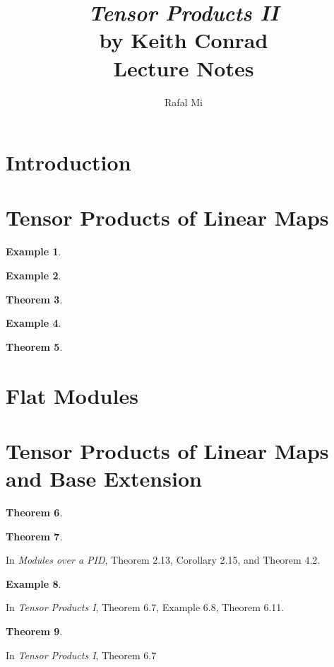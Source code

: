 \documentclass{article}
\title{
    \textit{Tensor Products II} \\
    {\small by Keith Conrad} \\
    Lecture Notes
}
\author{Rafal Mi}
\newtheorem{theorem}{Theorem}[section]
\newtheorem{example}[theorem]{Example}
\begin{document}
\maketitle

\section{Introduction}

\section{Tensor Products of Linear Maps}

\begin{example}
\end{example}

\begin{example}
\end{example}

\begin{theorem}
\end{theorem}

\begin{example}
\end{example}

\begin{theorem}
\end{theorem}

\section{Flat Modules}

\section{Tensor Products of Linear Maps and Base Extension}

\begin{theorem}
\end{theorem}

\begin{theorem}
\end{theorem}
In \textit{Modules over a PID}, Theorem 2.13, Corollary 2.15, and Theorem 4.2.

\begin{example}
\end{example}
In \textit{Tensor Products I}, Theorem 6.7, Example 6.8, Theorem 6.11.

\begin{theorem}
\end{theorem}
In \textit{Tensor Products I}, Theorem 6.7
\end{document}
